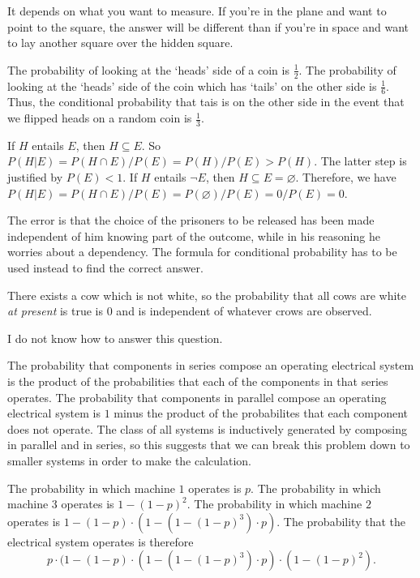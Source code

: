 \documentclass{article}
\begin{document}
\begin{ex}
It depends on what you want to measure. If you're in the plane and want to point to the square, the answer will be different than if you're in space and want to lay another square over the hidden square.
\end{ex}

\setcounter{ex}{0}

\begin{ex}
The probability of looking at the `heads' side of a coin is $\frac{1}{2}$. The probability of looking at the `heads' side of the coin which has `tails' on the other side is $\frac{1}{6}$. Thus, the conditional probability that tais is on the other side in the event that  we flipped heads on a random coin is $\frac{1}{3}$.
\end{ex}

\begin{ex}
If $H$ entails $E$, then $H\subseteq E$. So $P(H|E)=P(H\cap E)/P(E)=P(H)/P(E)>P(H)$. The latter step is justified by $P(E)<1$. If $H$ entails $\neg E$, then $H\subseteq E=\varnothing$. Therefore, we have $P(H|E)=P(H\cap E)/P(E)=P(\varnothing)/P(E)=0/P(E)=0$.
\end{ex}

\begin{ex}
The error is that the choice of the prisoners to be released has been made independent of him knowing part of the outcome, while in his reasoning he worries about a dependency. The formula for conditional probability has to be used instead to find the correct answer.
\end{ex}

\begin{ex}
There exists a cow which is not white, so the probability that all cows are white \emph{at present} is true is $0$ and is independent of whatever crows are observed.
\end{ex}

\begin{ex}
I do not know how to answer this question.
\end{ex}

\begin{ex}
The probability that components in series compose an operating electrical system is the product of the probabilities that each of the components in that series operates. The probability that components in parallel compose an operating electrical system is $1$ minus the product of the probabilites that each component does not operate. The class of all systems is inductively generated by composing in parallel and in series, so this suggests that we can break this problem down to smaller systems in order to make the calculation.

The probability in which machine $1$ operates is $p$. The probability in which machine $3$ operates is $1-(1-p)^2$. The probability in which machine $2$ operates is $1-(1-p)\cdot(1-(1-(1-p)^3)\cdot p)$. The probability that the electrical system operates is therefore
\begin{equation*}
p\cdot(1-(1-p)\cdot(1-(1-(1-p)^3)\cdot p)\cdot(1-(1-p)^2).
\end{equation*}
\end{ex}
\end{document}
